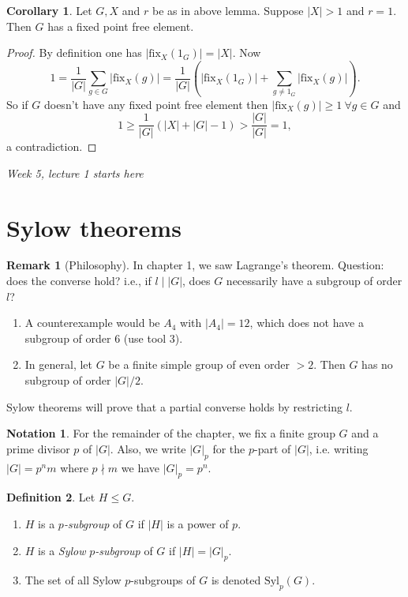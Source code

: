 \documentclass[a4paper]{article}
\newcommand{\Syl}{\text{Syl}}
\newcommand{\fix}{\text{fix}}
\theoremstyle{definition}
\newtheorem{defn}{Definition}[subsection]
\newtheorem{coro}[defn]{Corollary}
\newtheorem*{remark}{Remark}
\newtheorem*{notation}{Notation}
\begin{document}
\begin{coro}
Let $G,X$ and $r$ be as in above lemma. Suppose $|X|>1$ and $r=1$. Then $G$ has a fixed point free element.
\end{coro}
\begin{proof}
By definition one has $|\fix_X(1_G)|=|X|$. Now
\[
1=\frac{1}{|G|}\sum_{g\in G} |\fix_X(g)|=\frac{1}{|G|}\left(|\fix_X(1_G)|+\sum_{g\neq 1_G} |\fix_X(g)|\right).
\]
So if $G$ doesn't have any fixed point free element then $|\fix_X(g)|\geq 1 \ \forall g\in G$ and
\[
1\geq \frac{1}{|G|}(|X|+|G|-1)>\frac{|G|}{|G|}=1,
\]
a contradiction.
\end{proof}

\begin{flushright}
\textit{Week 5, lecture 1 starts here}
\end{flushright}

\section{Sylow theorems}
\begin{remark}[Philosophy]
In chapter 1, we saw Lagrange's theorem. Question: does the converse hold? i.e., if $l\mid |G|$, does $G$ necessarily have a subgroup of order $l$?
\begin{enumerate}
\item A counterexample would be $A_4$ with $|A_4|=12$, which does not have a subgroup of order 6 (use tool 3).
\item In general, let $G$ be a finite simple group of even order $>2$. Then $G$ has no subgroup of order $|G|/2$.
\end{enumerate}
Sylow theorems will prove that a partial converse holds by restricting $l$.
\end{remark}

\begin{notation}
For the remainder of the chapter, we fix a finite group $G$ and a prime divisor $p$ of $|G|$. Also, we write $|G|_p$ for the $p$-part of $|G|$, i.e. writing $|G|=p^n m$ where $p\nmid m$ we have $|G|_p=p^n$.
\end{notation}

\begin{defn}
Let $H\leq G$.
\begin{enumerate}
\item $H$ is a $p$\textit{-subgroup} of $G$ if $|H|$ is a power of $p.$
\item $H$ is a \textit{Sylow} $p$\textit{-subgroup} of $G$ if $|H|=|G|_p$.
\item The set of all Sylow $p$-subgroups of $G$ is denoted $\Syl_p(G)$.
\end{enumerate}
\end{defn}
\end{document}
